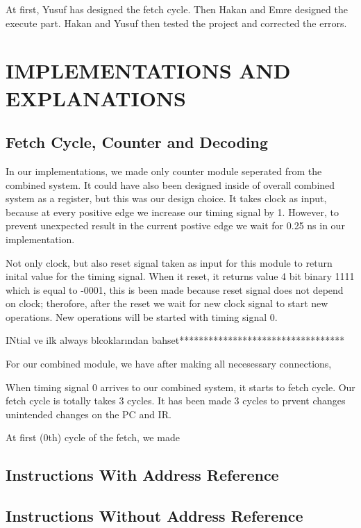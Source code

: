 \documentclass[pdftex,12pt,a4paper]{article}
\begin{document}
At first, Yusuf has designed the fetch cycle. Then Hakan and Emre designed the execute part. Hakan and Yusuf then tested the project and corrected the errors.


\section{IMPLEMENTATIONS AND EXPLANATIONS }
\subsection{Fetch Cycle, Counter and Decoding}
In our implementations, we made only counter module seperated from the 
combined system. It could have also been designed inside of overall 
combined system as a register, but this was our design choice. It takes 
clock as input, because at every positive edge we increase our timing signal
by 1. However, to prevent unexpected result in the current postive edge we wait for
0.25 ns in our implementation.

Not only clock, but also reset signal taken as input for this module
to return inital value for the timing signal. When it reset, it returns value 4 bit
binary 1111 which is equal to -0001, this is been made because reset signal 
does not depend on clock; therofore, after the reset we wait for new clock signal 
to start new operations. New operations will be started with timing signal 0.

INtial ve ilk always blcoklarından bahset**********************************

For our combined module, we have  after making all necesessary connections, 

When timing signal 0 arrives to our combined system, it starts to fetch cycle. Our 
fetch cycle is totally takes 3 cycles. It has been made 3 cycles to prvent 
changes unintended changes on the PC and IR.

At first (0th) cycle of the fetch, we made 





\subsection{Instructions With Address Reference}

\subsection{Instructions Without Address Reference}
\end{document}
